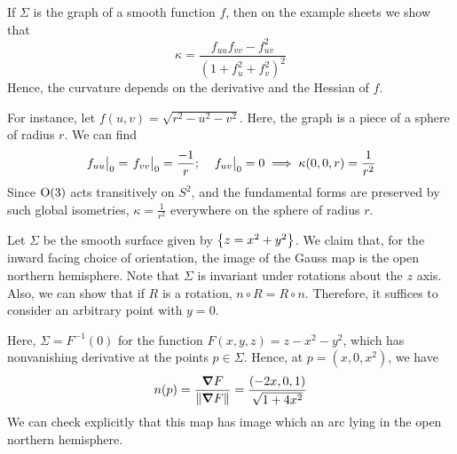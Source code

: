 \documentclass[a4paper]{article}
\begin{document}
\begin{example}
	If \( \Sigma \) is the graph of a smooth function \( f \), then on the example sheets we show that
	\[
		\kappa = \frac{f_{uu} f_{vv} - f_{uv}^2}{(1+f_u^2 + f_v^2)^2}
	\]
	Hence, the curvature depends on the derivative and the Hessian of \( f \).

	For instance, let \( f(u,v) = \sqrt{r^2 - u^2 - v^2} \).
	Here, the graph is a piece of a sphere of radius \( r \).
	We can find
	\[
		\teval{f_{uu}}0 = \teval{f_{vv}}0 = \frac{-1}{r};\quad \teval{f_{uv}}0 = 0 \implies \kappa(0,0,r) = \frac{1}{r^2}
	\]
	Since \( \mathrm{O}(3) \) acts transitively on \( S^2 \), and the fundamental forms are preserved by such global isometries, \( \kappa = \frac{1}{r^2} \) everywhere on the sphere of radius \( r \).
\end{example}

\begin{example}
	Let \( \Sigma \) be the smooth surface given by \( \qty{z = x^2 + y^2} \).
	We claim that, for the inward facing choice of orientation, the image of the Gauss map is the open northern hemisphere.
	Note that \( \Sigma \) is invariant under rotations about the \( z \) axis.
	Also, we can show that if \( R \) is a rotation, \( n \circ R = R \circ n \).
	Therefore, it suffices to consider an arbitrary point with \( y = 0 \).

	Here, \( \Sigma = F^{-1}(0) \) for the function \( F(x,y,z) = z - x^2 - y^2 \), which has nonvanishing derivative at the points \( p \in \Sigma \).
	Hence, at \( p = (x,0,x^2) \), we have
	\[
		n(p) = \frac{\grad{F}}{\norm{\grad{F}}} = \frac{(-2x,0,1)}{\sqrt{1+4x^2}}
	\]
	We can check explicitly that this map has image which an arc lying in the open northern hemisphere.
\end{example}
\end{document}
